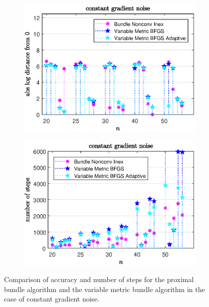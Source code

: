 \vspace{-1.5em}

\begin{figure}[H]
	\begin{subfigure}{0.49\textwidth}
		\includegraphics[width=\textwidth]{Pictures/Plots/constant_gradient_noise_b.eps}%
	\end{subfigure}%
	\hfill
	\begin{subfigure}{0.49\textwidth}
		\includegraphics[width=\textwidth]{Pictures/Plots/steps_constant_gradient_noise_b.eps}%
	\end{subfigure}
	\caption[Accuracy and number of steps: constant gradient noise, higher dimensions]{Comparison of accuracy and number of steps for the proximal bundle algorithm and the variable metric bundle algorithm in the case of constant gradient noise.}%
	\label{fig_const_grad_noise_large}%
\end{figure}

